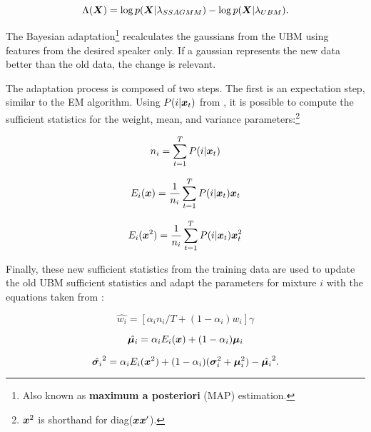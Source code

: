 \begin{equation}
    \Lambda(\dvec{X}) = \log p(\dvec{X}|\lambda_{SSAGMM}) - \log p(\dvec{X}|\lambda_{UBM}).
    \label{eq:score_of_X_ssagmm_ubm}
\end{equation}

The Bayesian adaptation\footnote{Also known as \textbf{maximum a posteriori} (MAP) estimation.} recalculates the gaussians from the UBM using features from the desired speaker only. If a gaussian represents the new data better than the old data, the change is relevant.

The adaptation process is composed of two steps. The first is an expectation step, similar to the EM algorithm. Using $P(i|\boldsymbol{x}_t)$ from , it is possible to compute the sufficient statistics for the weight, mean, and variance parameters:\footnote{$\boldsymbol{x}^2$ is shorthand for diag($\boldsymbol{x}\boldsymbol{x}'$).}

\begin{equation}
    n_i = \sum_{t=1}^{T} \postprob{i}{\dvec{x}_t}
    \label{eq:n_i}
\end{equation}

\begin{equation}
    E_i(\dvec{x}) = \frac{1}{n_i} \sum_{t=1}^{T} \postprob{i}{\dvec{x}_t} \dvec{x}_t
    \label{eq:E_x}
\end{equation}

\begin{equation}
    E_i(\dvec{x}^2) = \frac{1}{n_i} \sum_{t=1}^{T} \postprob{i}{\dvec{x}_t} \dvec{x}_t^2
    \label{eq:E_x2}
\end{equation}

Finally, these new sufficient statistics from the training data are used to update the old UBM sufficient statistics and adapt the parameters for mixture $i$ with the equations taken from :

\begin{equation}
    \hat{w_i} = [\alpha_i n_i / T + (1 - \alpha_i)w_i]\gamma
    \label{eq:adapted_weight}
\end{equation}

\begin{equation}
    \hat{\dvec{\mu}_i} = \alpha_i E_i(\dvec{x}) + (1 - \alpha_i)\dvec{\mu}_i
    \label{eq:adapted_means}
\end{equation}

\begin{equation}
    \hat{\dvec{\sigma}_i}^2 = \alpha_i E_i(\dvec{x}^2) + (1 - \alpha_i)(\dvec{\sigma}_i^2 + \dvec{\mu}_i^2) - \hat{\dvec{\mu}_i}^2.
    \label{eq:adapted_variances}
\end{equation}

